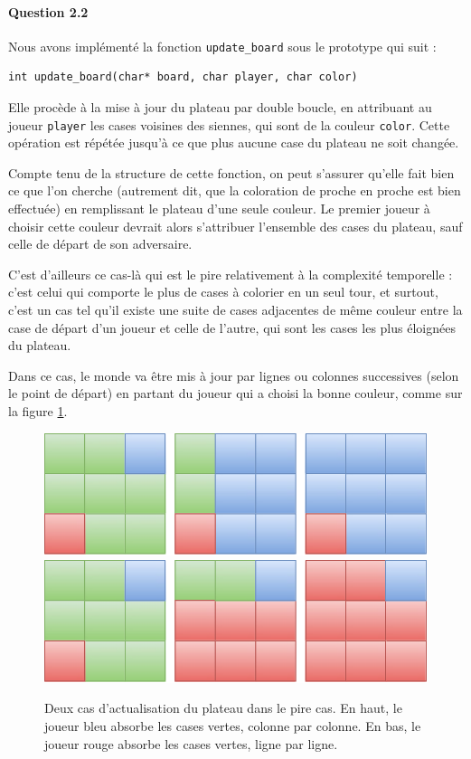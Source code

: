 \documentclass[a4paper]{article}
\begin{document}
    \paragraph{Question 2.2}

    Nous avons implémenté la fonction \texttt{update\_board} sous le prototype 
qui suit :
\begin{lstlisting}
int update_board(char* board, char player, char color)
\end{lstlisting}
Elle procède à la mise à jour du plateau par double boucle, en attribuant au 
joueur \texttt{player} les cases voisines des siennes, qui sont de la couleur 
\texttt{color}.
Cette opération est répétée jusqu'à ce que plus aucune case du plateau ne soit 
changée.

Compte tenu de la structure de cette fonction, on peut s'assurer qu'elle fait 
bien ce que l'on cherche (autrement dit, que la coloration de proche en proche 
est bien effectuée) en remplissant le plateau d'une seule couleur. Le premier 
joueur à choisir cette couleur devrait alors s'attribuer l'ensemble des cases 
du plateau, sauf celle de départ de son adversaire. 

C'est d'ailleurs ce cas-là qui est le pire relativement à la complexité 
temporelle : c'est celui qui comporte le plus de cases à colorier en un seul 
tour, et surtout, c'est un cas tel qu'il existe une suite de cases adjacentes 
de même couleur entre la case de départ d'un joueur et celle de l'autre, qui 
sont les cases les plus éloignées du plateau.

Dans ce cas, le monde va être mis à jour par lignes ou colonnes successives 
(selon le point 
de départ) en partant du joueur qui a choisi la bonne couleur, comme sur la 
figure \ref{update_board}.
\begin{figure}
	\centering
	
	\includegraphics[width=.45\columnwidth]{update_board_arcsys_1} \\
	\vspace{1cm}
	\includegraphics[width=.45\columnwidth]{update_board_arcsys_2}
	
	\caption{\label{update_board} Deux cas d'actualisation du plateau dans 
le pire cas. En haut, le joueur bleu absorbe les cases vertes, colonne par 
colonne. En bas, le joueur rouge absorbe les cases vertes, ligne par ligne.}
\end{figure}
\end{document}
